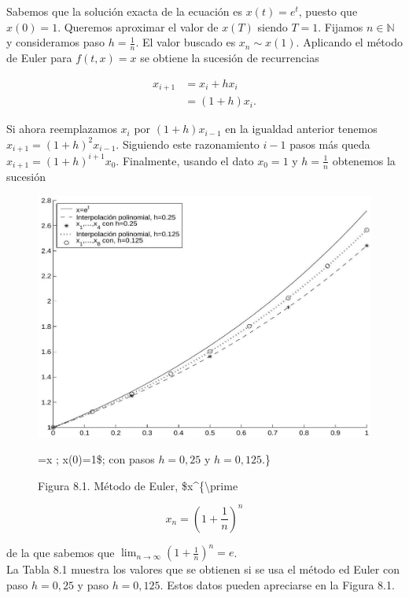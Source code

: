 \documentclass[10pt]{book}
\begin{document}
Sabemos que la solución exacta de la ecuación es $x(t)=e^{t}$, puesto que $x(0)=1$. Queremos aproximar el valor de $x(T)$ siendo $T=1$. Fijamos $n \in \mathbb{N}$ y consideramos paso $h=\frac{1}{n}$. El valor buscado es $x_{n} \sim x(1)$. Aplicando el método de Euler para $f(t, x)=x$ se obtiene la sucesión de recurrencias

$$
\begin{aligned}
x_{i+1} & =x_{i}+h x_{i} \\
& =(1+h) x_{i} .
\end{aligned}
$$

Si ahora reemplazamos $x_{i}$ por $(1+h) x_{i-1}$ en la igualdad anterior tenemos $x_{i+1}=(1+h)^{2} x_{i-1}$. Siguiendo este razonamiento $i-1$ pasos más queda $x_{i+1}=(1+h)^{i+1} x_{0}$. Finalmente, usando el dato $x_{0}=1$ y $h=\frac{1}{n}$ obtenemos la sucesión

\begin{figure}[h]
\begin{center}
  \includegraphics[width=\textwidth]{2025_09_05_3888c9ac96bd653d96b4g-175}
\captionsetup{labelformat=empty}
\caption{Figura 8.1. Método de Euler, \$x\^{}\{\textbackslash prime}=x ; x(0)=1\$; con pasos $h=0,25$ y $h=0,125$.\}\end{center}
\end{figure}

$$
x_{n}=\left(1+\frac{1}{n}\right)^{n}
$$

de la que sabemos que $\lim _{n \rightarrow \infty}\left(1+\frac{1}{n}\right)^{n}=e$.\\
La Tabla 8.1 muestra los valores que se obtienen si se usa el método ed Euler con paso $h=0,25$ y paso $h=0,125$. Estos datos pueden apreciarse en la Figura 8.1.
\end{document}
